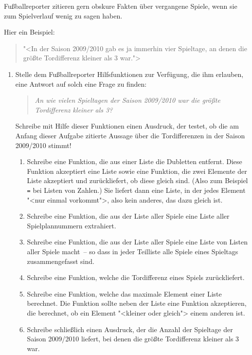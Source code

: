 \begin{aufgabe}
  Fußballreporter zitieren gern obskure Fakten über
  vergangene Spiele, wenn sie zum Spielverlauf wenig zu sagen haben.

  Hier ein Beispiel:
  \begin{quote}
    "<In der Saison 2009/2010 gab es ja immerhin vier Spieltage, an
    denen die größte Tordifferenz kleiner als 3 war.">
  \end{quote}
\begin{enumerate}
\item Stelle dem Fußballreporter Hilfsfunktionen zur Verfügung,
  die ihm erlauben, eine Antwort auf solch eine Frage zu
  finden:
  \begin{quote}
    \emph{An wie vielen Spieltagen der Saison 2009/2010 war die größte
    Tordifferenz kleiner als 3?}
  \end{quote}
  Schreibe mit Hilfe dieser Funktionen einen Ausdruck, der
  testet, ob die am Anfang dieser Aufgabe zitierte Aussage über die
  Tordifferenzen in der Saison 2009/2010 stimmt!

  \begin{enumerate}
  \item Schreibe eine Funktion, die aus einer Liste die Dubletten
    entfernt.  Diese Funktion akzeptiert eine Liste sowie eine
    Funktion, die zwei Elemente der Liste akzeptiert und
    zurückliefert, ob diese gleich sind.  (Also zum Beispiel
    \texttt{=} bei Listen von Zahlen.)  Sie liefert dann eine Liste,
    in der jedes Element "<nur einmal vorkommt">, also kein anderes,
    das dazu gleich ist.
  \item Schreibe eine Funktion, die aus der Liste aller Spiele
    eine Liste aller Spielplannummern extrahiert.
  \item Schreibe eine Funktion, die aus der Liste aller Spiele
    eine Liste von Listen aller Spiele macht~-- so dass in jeder
    Teilliste alle Spiele eines Spieltags zusammengefasst sind.
  \item Schreibe eine Funktion, welche die Tordifferenz eines
    Spiels zurückliefert.
  \item Schreibe eine Funktion, welche das maximale Element einer
    Liste berechnet.  Die Funktion sollte neben der Liste eine
    Funktion akzeptieren, die berechnet, ob ein Element "<kleiner oder
    gleich"> einem anderen ist.
  \item Schreibe schließlich einen Ausdruck, der die Anzahl der
    Spieltage der Saison 2009/2010 liefert, bei denen die größte
    Tordifferenz kleiner als 3 war.
  \end{enumerate}


\end{enumerate}
\end{aufgabe}
